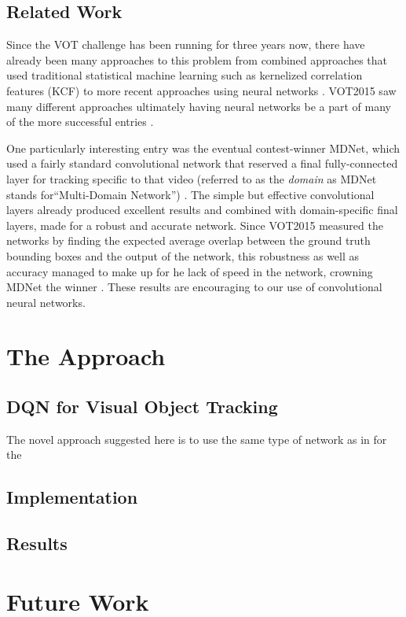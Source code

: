 \documentclass[letterpaper,12pt,titlepage,oneside,final]{book}
\begin{document}
\section{Related Work}

Since the VOT challenge has been running for three years now, there have already been many approaches to this problem from combined approaches that used traditional statistical machine learning such as kernelized correlation features (KCF) \cite{kcf} to more recent approaches using neural networks \cite{mdnet}. VOT2015 saw many different approaches ultimately having neural networks be a part of many of the more successful entries \cite{vot2015}.

One particularly interesting entry was the eventual contest-winner MDNet, which used a fairly standard convolutional network that reserved a final fully-connected layer for tracking specific to that video (referred to as the \textit{domain} as MDNet stands for``Multi-Domain Network'') \cite{mdnet}. The simple but effective convolutional layers already produced excellent results and combined with domain-specific final layers, made for a robust and accurate network. Since VOT2015 measured the networks by finding the expected average overlap between the ground truth bounding boxes and the output of the network, this robustness as well as accuracy managed to make up for he lack of speed in the network, crowning MDNet the winner \cite{vot2015}. These results are encouraging to our use of convolutional neural networks.


\chapter{The Approach}
\section{DQN for Visual Object Tracking}
The novel approach suggested here is to use the same type of network as in \cite{atari-dqn} for the 


\section{Implementation}
\section{Results}

\chapter{Future Work}
\end{document}
